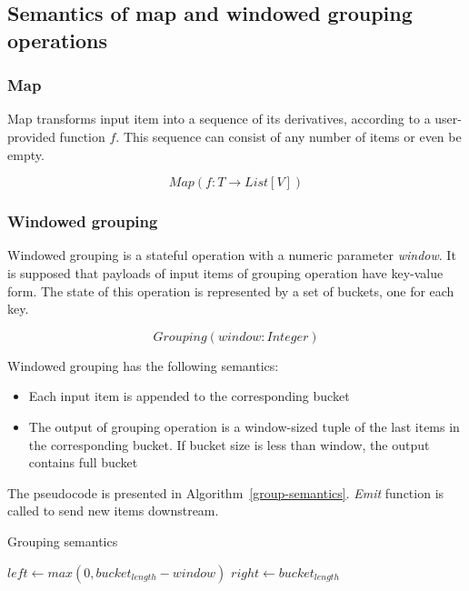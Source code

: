 \subsection{Semantics of map and windowed grouping operations}

\subsubsection{Map}
Map transforms input item into a sequence of its derivatives, according to a user-provided function $f$. This sequence can consist of any number of items or even be empty.

\[Map(f: T \rightarrow List[V])\]

\subsubsection{Windowed grouping}
Windowed grouping is a stateful operation with a numeric parameter {\it window}. It is supposed that payloads of input items of grouping operation have key-value form. The state of this operation is represented by a set of buckets, one for each key. 

\[Grouping(window: Integer)\]

Windowed grouping has the following semantics:

\begin{itemize}
    \item Each input item is appended to the corresponding bucket
    \item The output of grouping operation is a window-sized tuple of the last items in the corresponding bucket. If bucket size is less than window, the output contains full bucket
\end{itemize}

The pseudocode is presented in Algorithm~\ref{group-semantics}. {\it Emit} function is called to send new items downstream.

\begin{algorithm}
\caption{Grouping semantics}
\label{group-semantics}
  \begin{algorithmic}[1]
      \State {}
      \State $left \gets max(0, bucket_{length} - window)$
      \State $right \gets bucket_{length}$
      \State {}
    \EndFunction
  \end{algorithmic}
\end{algorithm}

